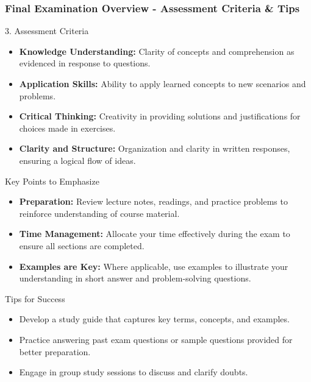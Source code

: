 \documentclass[aspectratio=169]{beamer}
\begin{document}
\begin{frame}[fragile]
    \frametitle{Final Examination Overview - Assessment Criteria & Tips}
    \begin{block}{3. Assessment Criteria}
        \begin{itemize}
            \item \textbf{Knowledge Understanding:} Clarity of concepts and comprehension as evidenced in response to questions.
            \item \textbf{Application Skills:} Ability to apply learned concepts to new scenarios and problems.
            \item \textbf{Critical Thinking:} Creativity in providing solutions and justifications for choices made in exercises.
            \item \textbf{Clarity and Structure:} Organization and clarity in written responses, ensuring a logical flow of ideas.
        \end{itemize}
    \end{block}
    
    \begin{block}{Key Points to Emphasize}
        \begin{itemize}
            \item \textbf{Preparation:} Review lecture notes, readings, and practice problems to reinforce understanding of course material.
            \item \textbf{Time Management:} Allocate your time effectively during the exam to ensure all sections are completed.
            \item \textbf{Examples are Key:} Where applicable, use examples to illustrate your understanding in short answer and problem-solving questions.
        \end{itemize}
    \end{block}

    \begin{block}{Tips for Success}
        \begin{itemize}
            \item Develop a study guide that captures key terms, concepts, and examples.
            \item Practice answering past exam questions or sample questions provided for better preparation.
            \item Engage in group study sessions to discuss and clarify doubts.
        \end{itemize}
    \end{block}
\end{frame}
\end{document}
